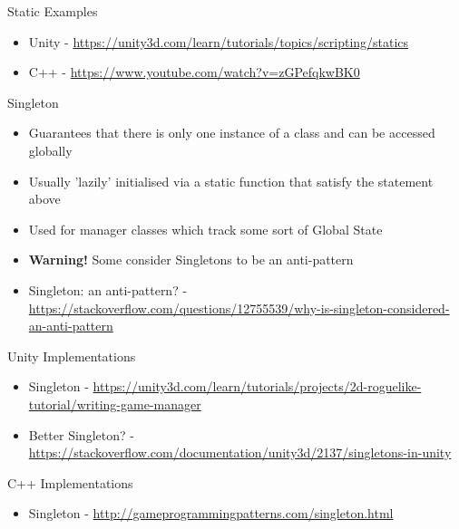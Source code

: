 \begin{frame}{Static Examples}
	\begin{itemize}
		\pause \item Unity - \url{https://unity3d.com/learn/tutorials/topics/scripting/statics}
		\pause \item C++ - \url{https://www.youtube.com/watch?v=zGPefqkwBK0}
	\end{itemize}
\end{frame}

\begin{frame}{Singleton}
	\begin{itemize}
		\pause \item Guarantees that there is only one instance of a class and can be accessed globally
		\pause \item Usually 'lazily' initialised via a static function that satisfy the statement above
		\pause \item Used for manager classes which track some sort of Global State
		\pause \item \textbf{Warning!} Some consider Singletons to be an anti-pattern
		\pause \item Singleton: an anti-pattern? - \url{https://stackoverflow.com/questions/12755539/why-is-singleton-considered-an-anti-pattern}
	\end{itemize}
\end{frame}

\begin{frame}{Unity Implementations}
	\begin{itemize}
		\item Singleton - \url{https://unity3d.com/learn/tutorials/projects/2d-roguelike-tutorial/writing-game-manager}
		\item Better Singleton? - \url{https://stackoverflow.com/documentation/unity3d/2137/singletons-in-unity}
	\end{itemize}
\end{frame}

\begin{frame}{C++ Implementations}
\begin{itemize}
	\item Singleton - \url{http://gameprogrammingpatterns.com/singleton.html}
\end{itemize}
\end{frame}